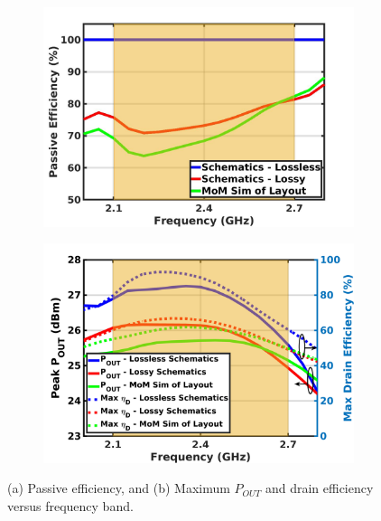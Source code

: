 \documentclass[conference]{IEEEtran}
\begin{document}
\begin{figure}[!t]
\captionsetup{font=footnotesize}
\centering
\begin{subfigure}{0.24\textwidth}
\centering
\includegraphics[width=1\textwidth]{Images/Output_Network_Comp/Comp_PasEff_loss_layout_km0p69.jpg}
\caption{}
\label{fig:Comp_PasEff_loss_layout_km0p69}
\end{subfigure}
\begin{subfigure}{0.24\textwidth}
\includegraphics[width=1\textwidth]{Images/Output_Network_Comp/Comp_Pout_DE_loss_layout_km0p69.jpg}
\caption{}
\label{fig:Comp_Pout_DE_loss_layout_km0p69}
\end{subfigure}
\caption{(a) Passive efficiency, and (b) Maximum $P_{OUT}$ and drain efficiency versus frequency band.}
\label{fig:Comp_Pout_DE}
\vspace{-0.25in}
\end{figure}
\end{document}
